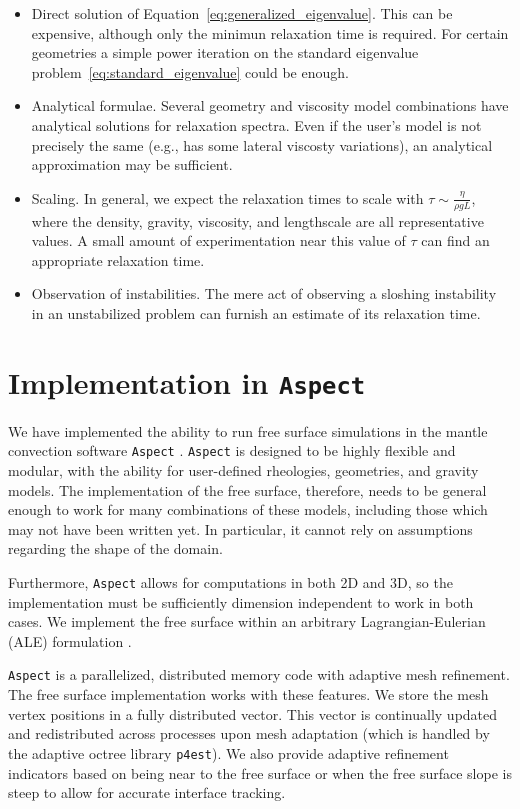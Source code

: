 \documentclass[preprint,12pt,authoryear]{elsarticle}
\begin{document}
\begin{itemize}
\item Direct solution of Equation~\eqref{eq:generalized_eigenvalue}. This can be expensive, although
only the minimun relaxation time is required. For certain geometries a simple power iteration on 
the standard eigenvalue problem~\eqref{eq:standard_eigenvalue} could be enough.
\item Analytical formulae. Several geometry and viscosity model combinations have analytical solutions
for relaxation spectra. Even if the user's model is not precisely the same (e.g., has some lateral viscosty
variations), an analytical approximation may be sufficient.
\item Scaling. In general, we expect the relaxation times to scale with $\tau \sim \frac{\eta}{\rho g L}$,
where the density, gravity, viscosity, and lengthscale are all representative values.  A small amount
of experimentation near this value of $\tau$ can find an appropriate relaxation time.
\item Observation of instabilities.  The mere act of observing a sloshing instability in an unstabilized
problem can furnish an estimate of its relaxation time.
\end{itemize} 


\section{Implementation in \texttt{Aspect} }
We have implemented the ability to run free surface simulations in the mantle convection software \texttt{Aspect} \citep{kronbichler2012high}. 
\texttt{Aspect} is designed to be highly flexible and modular, with the ability for user-defined rheologies, geometries, and gravity models. 
The implementation of the free surface, therefore, needs to be general enough to work for many combinations of these models, including those 
which may not have been written yet. In particular, it cannot rely on assumptions regarding the shape of the domain.

Furthermore, \texttt{Aspect} allows for computations in both 2D and 3D, so the implementation must be sufficiently dimension
independent to work in both cases. We implement the free surface within an arbitrary Lagrangian-Eulerian (ALE) formulation
\citep[e.g][]{fullsack1995arbitrary,donea2004encyclopedia}.

\texttt{Aspect} is a parallelized, distributed memory code with adaptive mesh refinement.
The free surface implementation works with these features.  We store the mesh vertex positions 
in a fully distributed vector. This vector is continually updated and redistributed across 
processes upon mesh adaptation (which is handled by the adaptive octree library \texttt{p4est}).
We also provide adaptive refinement indicators based on being near to the free surface or 
when the free surface slope is steep to allow for accurate interface tracking.
\end{document}
